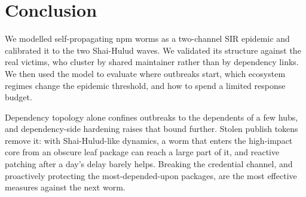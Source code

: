 \section{Conclusion}\label{sec:conclusion}

We modelled self-propagating npm worms as a two-channel SIR epidemic and calibrated it to the two
Shai-Hulud waves. We validated its structure against the real victims, who cluster by shared maintainer
rather than by dependency links. We then used the model to evaluate where outbreaks start, which
ecosystem regimes change the epidemic threshold, and how to spend a limited response budget.

Dependency topology alone confines outbreaks to the dependents of a few hubs, and dependency-side
hardening raises that bound further. Stolen publish tokens remove it: with Shai-Hulud-like dynamics, a
worm that enters the high-impact core from an obscure leaf package can reach a large part of it, and
reactive patching after a day's delay barely helps. Breaking the credential channel, and proactively
protecting the most-depended-upon packages, are the most effective measures against the next worm.
